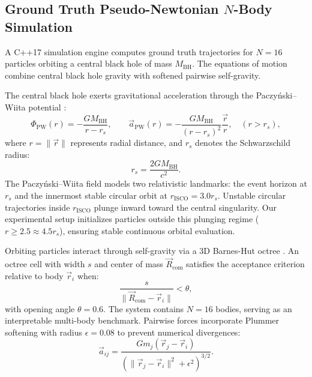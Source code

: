 \documentclass[11pt,a4paper]{article}
\begin{document}
\subsection{Ground Truth Pseudo-Newtonian \texorpdfstring{$N$}{N}-Body Simulation}
A C++17 simulation engine computes ground truth trajectories for $N=16$ particles orbiting a central black hole of mass $M_{\mathrm{BH}}$. The equations of motion combine central black hole gravity with softened pairwise self-gravity.

The central black hole exerts gravitational acceleration through the Paczy\'nski--Wiita potential \cite{Paczynski1980}:
\begin{equation}
    \Phi_{\mathrm{PW}}(r) = -\frac{G M_{\mathrm{BH}}}{r - r_s}, \qquad \vec{a}_{\mathrm{PW}}(r) = -\frac{G M_{\mathrm{BH}}}{(r - r_s)^2} \frac{\vec{r}}{r}, \quad (r > r_s),
\end{equation}
where $r = \|\vec{r}\|$ represents radial distance, and $r_s$ denotes the Schwarzschild radius:
\begin{equation}
    r_s = \frac{2 G M_{\mathrm{BH}}}{c^2}.
\end{equation}
The Paczy\'nski--Wiita field models two relativistic landmarks: the event horizon at $r_s$ and the innermost stable circular orbit at $r_{\mathrm{ISCO}} = 3.0 r_s$. Unstable circular trajectories inside $r_{\mathrm{ISCO}}$ plunge inward toward the central singularity. Our experimental setup initializes particles outside this plunging regime ($r \ge 2.5 \approx 4.5 r_s$), ensuring stable continuous orbital evaluation.

Orbiting particles interact through self-gravity via a 3D Barnes-Hut octree \cite{Barnes1986}. An octree cell with width $s$ and center of mass $\vec{R}_{\mathrm{com}}$ satisfies the acceptance criterion relative to body $\vec{r}_i$ when:
\begin{equation}
    \frac{s}{\|\vec{R}_{\mathrm{com}} - \vec{r}_i\|} < \theta,
\end{equation}
with opening angle $\theta = 0.6$. The system contains $N=16$ bodies, serving as an interpretable multi-body benchmark. Pairwise forces incorporate Plummer softening \cite{Plummer1911} with radius $\epsilon = 0.08$ to prevent numerical divergences:
\begin{equation}
    \vec{a}_{ij} = \frac{G m_j (\vec{r}_j - \vec{r}_i)}{\left(\|\vec{r}_j - \vec{r}_i\|^2 + \epsilon^2\right)^{3/2}}.
\end{equation}
\end{document}

